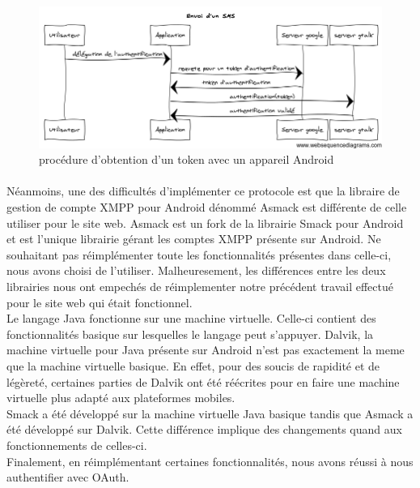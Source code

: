 

\begin{figure}[!h]
	\center
	\includegraphics[width=15cm]{img/obtention-token-avec-android.png}
	\caption{procédure d'obtention d'un token avec un appareil Android}
\end{figure}


\paragraph{}
Néanmoins, une des difficultés d'implémenter ce protocole est que la libraire de gestion de compte
XMPP pour Android dénommé Asmack est différente de celle utiliser pour le site web. Asmack est un fork 
de la librairie Smack pour Android et est l'unique librairie gérant les comptes XMPP présente sur
Android. Ne souhaitant pas réimplémenter toute les fonctionnalités présentes dans celle-ci, nous avons
choisi de l'utiliser. Malheuresement, les différences entre les deux librairies nous ont empechés de 
réimplementer notre précédent travail effectué pour le site web qui était fonctionnel. 
\\
Le langage Java fonctionne sur une machine virtuelle. Celle-ci contient des fonctionnalités basique sur
lesquelles le langage peut s'appuyer. Dalvik, la machine virtuelle pour Java présente sur Android n'est 
pas exactement la meme que la machine virtuelle basique. En effet, pour des soucis de rapidité et de 
légèreté, certaines parties de Dalvik ont été réécrites pour en faire une machine virtuelle plus adapté
aux plateformes mobiles.
\\
Smack a été développé sur la machine virtuelle Java basique tandis que Asmack a été développé sur Dalvik.
Cette différence implique des changements quand aux fonctionnements de celles-ci. 
\\
Finalement, en réimplémentant certaines fonctionnalités, nous avons réussi à nous authentifier avec OAuth.

